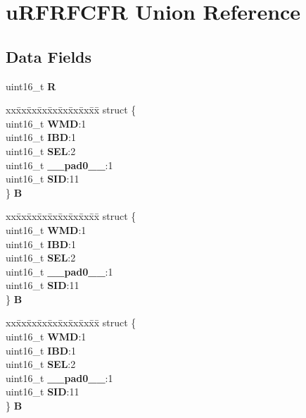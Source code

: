 \hypertarget{unionuRFRFCFR}{}\section{u\+R\+F\+R\+F\+C\+FR Union Reference}
\label{unionuRFRFCFR}
\subsection*{Data Fields}
\begin{DoxyCompactItemize}
\item 
\mbox{\label{unionuRFRFCFR_a89c50fea0d8c7a899c2315982f800ce0}} 
uint16\+\_\+t {\bfseries R}
\item 
\mbox{\label{unionuRFRFCFR_a6bf20334c943440d7428d6bcab7c3791}} 
\begin{tabbing}
xx\=xx\=xx\=xx\=xx\=xx\=xx\=xx\=xx\=\kill
struct \{\\
\>uint16\_t {\bfseries WMD}:1\\
\>uint16\_t {\bfseries IBD}:1\\
\>uint16\_t {\bfseries SEL}:2\\
\>uint16\_t {\bfseries \_\_pad0\_\_}:1\\
\>uint16\_t {\bfseries SID}:11\\
\} {\bfseries B}\\

\end{tabbing}\item 
\mbox{\label{unionuRFRFCFR_afd1d08aeb6febf907639848b1d13f46e}} 
\begin{tabbing}
xx\=xx\=xx\=xx\=xx\=xx\=xx\=xx\=xx\=\kill
struct \{\\
\>uint16\_t {\bfseries WMD}:1\\
\>uint16\_t {\bfseries IBD}:1\\
\>uint16\_t {\bfseries SEL}:2\\
\>uint16\_t {\bfseries \_\_pad0\_\_}:1\\
\>uint16\_t {\bfseries SID}:11\\
\} {\bfseries B}\\

\end{tabbing}\item 
\mbox{\label{unionuRFRFCFR_a475c58af402978834c4499d9d0a0365e}} 
\begin{tabbing}
xx\=xx\=xx\=xx\=xx\=xx\=xx\=xx\=xx\=\kill
struct \{\\
\>uint16\_t {\bfseries WMD}:1\\
\>uint16\_t {\bfseries IBD}:1\\
\>uint16\_t {\bfseries SEL}:2\\
\>uint16\_t {\bfseries \_\_pad0\_\_}:1\\
\>uint16\_t {\bfseries SID}:11\\
\} {\bfseries B}\\


\end{tabbing}
\end{DoxyCompactItemize}
